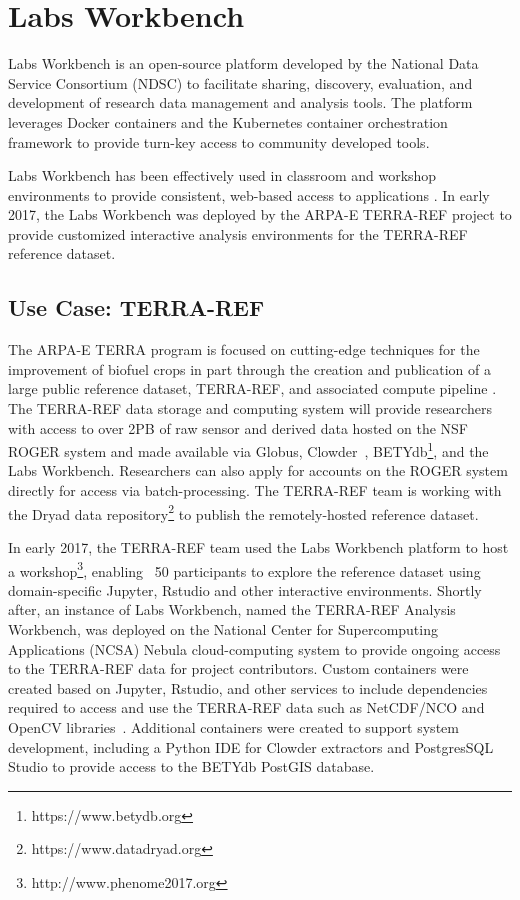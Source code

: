 \documentclass{sig-alternate}
\begin{document}
\section{Labs Workbench}

Labs Workbench is an open-source platform developed by the National Data Service Consortium (NDSC) to facilitate sharing, discovery, evaluation, and development of research data management and analysis tools. The platform leverages Docker containers and the Kubernetes container orchestration framework to provide turn-key access to community developed tools. 

Labs Workbench has been effectively used in classroom and workshop environments to provide consistent, web-based access to applications \cite{ndsphenome}. In early 2017, the Labs Workbench was deployed by the ARPA-E TERRA-REF project to provide customized interactive analysis environments for the TERRA-REF reference dataset. 

\subsection{Use Case: TERRA-REF}

The ARPA-E TERRA program is focused on cutting-edge techniques for the improvement of biofuel crops in part through the creation and publication of a large public reference dataset, TERRA-REF, and associated compute pipeline \cite{arpae2015}. The TERRA-REF data storage and computing system will provide researchers with access to over 2PB of raw sensor and derived data hosted on the NSF ROGER system and made available via Globus, Clowder~\cite{Marini10,Sophocleous17}, BETYdb\footnote{\small https://www.betydb.org}, and the Labs Workbench. Researchers can also apply for accounts on the ROGER system directly for access via batch-processing. The TERRA-REF team is working with the Dryad data repository\footnote{\small https://www.datadryad.org} to publish the remotely-hosted reference dataset.

In early 2017, the TERRA-REF team used the Labs Workbench platform to host a workshop\footnote{\small http://www.phenome2017.org}, enabling ~50 participants to explore the reference dataset using domain-specific Jupyter, Rstudio and other interactive environments. Shortly after, an instance of Labs Workbench, named the TERRA-REF Analysis Workbench, was deployed on the National Center for Supercomputing Applications (NCSA) Nebula cloud-computing system to provide ongoing access to the TERRA-REF data for project contributors. Custom containers were created based on Jupyter, Rstudio, and other services to include dependencies required to access and use the TERRA-REF data such as NetCDF/NCO and OpenCV libraries~\cite{Kaebler}.  Additional containers were created to support system development, including a Python IDE for Clowder extractors and PostgresSQL Studio to provide access to the BETYdb PostGIS database.
\end{document}
